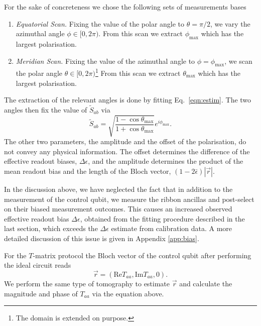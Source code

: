 \documentclass[a4paper,twocolumn,11pt, accepted=2024-06-14]{quantumarticle}
\begin{document}
For the sake of concreteness we chose the following sets of measurements bases  \begin{enumerate}
    \item \emph{Equatorial Scan.} Fixing the value of the polar angle to $\theta = \pi/2$, we vary the azimuthal angle $\phi \in [0, 2\pi)$. From this scan we extract $\phi_{\text{max}}$ which has the largest polarisation.
    \item \emph{Meridian Scan.} Fixing the value of the azimuthal angle to $\phi = \phi_{\text{max}}$, we scan the polar angle $\theta \in [0, 2\pi)$\footnote{The domain is extended on purpose.} From this scan we extract $\theta_{\text{max}}$ which has the largest polarisation.
\end{enumerate}
The extraction of the relevant angles is done by fitting Eq.~\eqref{eqn:estim}.
The two angles then fix the value of $\tilde{S}_{ab}$ via $$\tilde{S}_{ab} = \sqrt{\frac{1-\cos{\theta_{\text{max}}}}{1+\cos{\theta_{\text{max}}}}}e^{i\phi_{\text{max}}}.$$
The other two parameters, the amplitude and the offset of the polarisation, do not convey any physical information. The offset determines the difference of the effective readout biases, $\Delta\epsilon$, and the amplitude determines the product of the mean readout bias and the length of the Bloch vector, $(1-2\bar{\epsilon})|\vec{r}|$.


In the discussion above, we have neglected the fact that in addition to the measurement of the control qubit, we measure the ribbon ancillas and post-select on their biased measurement outcomes. This causes an increased observed effective readout bias $\Delta \epsilon$, obtained from the fitting procedure described in the last section, which exceeds the $\Delta \epsilon$ estimate from calibration data. A more detailed discussion of this issue is given in Appendix \ref{app:bias}. 


For the $T$-matrix protocol the Bloch vector of the control qubit after performing the ideal circuit reads
\begin{equation}
    \vec{r} = \left(  \text{Re}{T}_{aa}, \text{Im}{T}_{aa}, 0 \right).\label{eqn:blochT} 
\end{equation}
We perform the same type of tomography to estimate $\vec r$ and calculate the magnitude and phase of $T_{aa}$ via the equation above.
\end{document}
